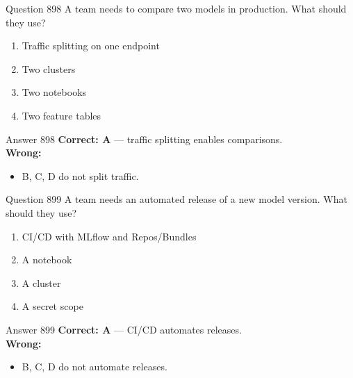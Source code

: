 \documentclass[aspectratio=169,11pt]{beamer}
\begin{document}
	\begin{frame}{Question 898}
		A team needs to compare two models in production. What should they use?
		\begin{enumerate}[label=\Alph*.]
			\item Traffic splitting on one endpoint
			\item Two clusters
			\item Two notebooks
			\item Two feature tables
		\end{enumerate}
	\end{frame}
	\begin{frame}{Answer 898}
		\textbf{Correct: A} --- traffic splitting enables comparisons.\\
		\vspace{0.5em}
		\textbf{Wrong:}
		\begin{itemize}
			\item B, C, D do not split traffic.
		\end{itemize}
	\end{frame}
	
	\begin{frame}{Question 899}
		A team needs an automated release of a new model version. What should they use?
		\begin{enumerate}[label=\Alph*.]
			\item CI/CD with MLflow and Repos/Bundles
			\item A notebook
			\item A cluster
			\item A secret scope
		\end{enumerate}
	\end{frame}
	\begin{frame}{Answer 899}
		\textbf{Correct: A} --- CI/CD automates releases.\\
		\vspace{0.5em}
		\textbf{Wrong:}
		\begin{itemize}
			\item B, C, D do not automate releases.
		\end{itemize}
	\end{frame}
	
\end{document}
